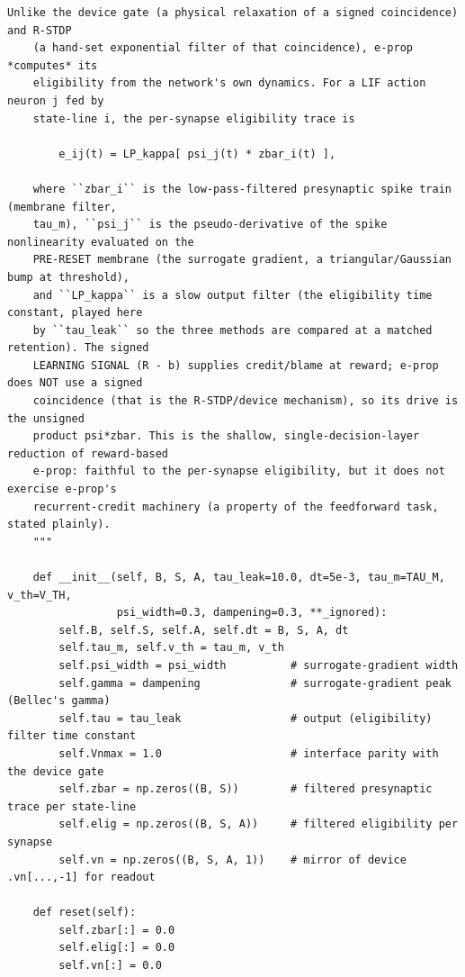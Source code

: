 \begin{lstlisting}[caption={mrl\_trace/maze.py},label={lst:siox-src-maze}]
    Unlike the device gate (a physical relaxation of a signed coincidence) and R-STDP
    (a hand-set exponential filter of that coincidence), e-prop *computes* its
    eligibility from the network's own dynamics. For a LIF action neuron j fed by
    state-line i, the per-synapse eligibility trace is

        e_ij(t) = LP_kappa[ psi_j(t) * zbar_i(t) ],

    where ``zbar_i`` is the low-pass-filtered presynaptic spike train (membrane filter,
    tau_m), ``psi_j`` is the pseudo-derivative of the spike nonlinearity evaluated on the
    PRE-RESET membrane (the surrogate gradient, a triangular/Gaussian bump at threshold),
    and ``LP_kappa`` is a slow output filter (the eligibility time constant, played here
    by ``tau_leak`` so the three methods are compared at a matched retention). The signed
    LEARNING SIGNAL (R - b) supplies credit/blame at reward; e-prop does NOT use a signed
    coincidence (that is the R-STDP/device mechanism), so its drive is the unsigned
    product psi*zbar. This is the shallow, single-decision-layer reduction of reward-based
    e-prop: faithful to the per-synapse eligibility, but it does not exercise e-prop's
    recurrent-credit machinery (a property of the feedforward task, stated plainly).
    """

    def __init__(self, B, S, A, tau_leak=10.0, dt=5e-3, tau_m=TAU_M, v_th=V_TH,
                 psi_width=0.3, dampening=0.3, **_ignored):
        self.B, self.S, self.A, self.dt = B, S, A, dt
        self.tau_m, self.v_th = tau_m, v_th
        self.psi_width = psi_width          # surrogate-gradient width
        self.gamma = dampening              # surrogate-gradient peak (Bellec's gamma)
        self.tau = tau_leak                 # output (eligibility) filter time constant
        self.Vnmax = 1.0                    # interface parity with the device gate
        self.zbar = np.zeros((B, S))        # filtered presynaptic trace per state-line
        self.elig = np.zeros((B, S, A))     # filtered eligibility per synapse
        self.vn = np.zeros((B, S, A, 1))    # mirror of device .vn[...,-1] for readout

    def reset(self):
        self.zbar[:] = 0.0
        self.elig[:] = 0.0
        self.vn[:] = 0.0


\end{lstlisting}
